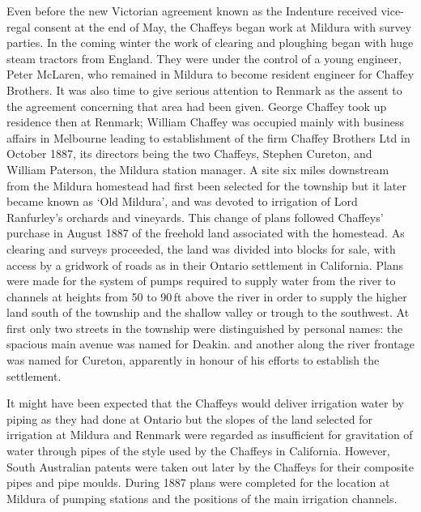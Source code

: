 Even before the new Victorian agreement known as the Indenture
received vice-regal consent at the end of May, the Chaffeys began work
at Mildura with survey parties.  In the coming winter the work of
clearing and ploughing began with huge steam tractors from England.
They were under the control of a young engineer, Peter McLaren, who
remained in Mildura to become resident engineer for Chaffey Brothers.
It was also time to give serious attention to Renmark as the assent to
the agreement concerning that area had been given.  George Chaffey
took up residence then at Renmark; William Chaffey was occupied mainly
with business affairs in Melbourne leading to establishment of the
firm Chaffey Brothers Ltd in October 1887, its directors being the two
Chaffeys, Stephen Cureton, and William Paterson, the Mildura station
manager.  A site six miles downstream
from the Mildura homestead had first been selected for the township
but it later became known as `Old Mildura', and was devoted to
irrigation of Lord Ranfurley's orchards and vineyards.  This change of plans followed Chaffeys' purchase in
August 1887 of the freehold land associated with the
homestead.  As clearing and surveys
proceeded, the land was divided into blocks for sale, with access by a
gridwork of roads as in their Ontario settlement in California.  Plans
were made for the system of pumps required to supply water from the
river to channels at heights from 50 to 90\,ft above the river in
order to supply the higher land south of the township and the shallow
valley or trough to the southwest.  At first
only two streets in the township were distinguished by personal names:
the spacious main avenue was named for Deakin. and another along the
river frontage was named for Cureton, apparently in honour of his
efforts to establish the settlement.

It might have been expected that the Chaffeys would deliver irrigation
water by piping as they had done at Ontario but the slopes of the land
selected for irrigation at Mildura and Renmark were regarded as
insufficient for gravitation of water through pipes of the style used
by the Chaffeys in California.  However, South Australian patents were
taken out later by the Chaffeys for their composite pipes and pipe
moulds.  During 1887 plans were completed
for the location at Mildura of pumping stations and the positions of
the main irrigation channels.

